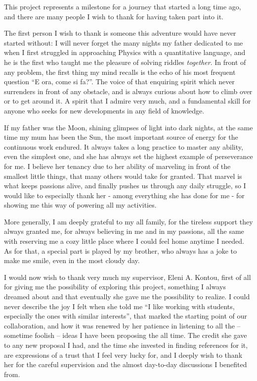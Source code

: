 This project represents a milestone for a journey that started a long time ago, and there are many people I wish to thank for having taken part into it.

The first person I wish to thank is someone this adventure would have never started without: I will never forget the many nights my father dedicated to me when I first struggled in approaching Physics with a quantitative language, and he is the first who taught me the pleasure of solving riddles \emph{together}. In front of any problem, the first thing my mind recalls is the echo of his most frequent question ``E ora, come si fa?''. The voice of that enquiring spirit which never surrenders in front of any obstacle, and is always curious about how to climb over or to get around it. A spirit that I admire very much, and a fundamental skill for anyone who seeks for new developments in any field of knowledge.

If my father was the Moon, shining glimpses of light into dark nights, at the same time my mum has been the Sun, the most important source of energy for the continuous work endured. It always takes a long practice to master any ability, even the simplest one, and she has always set the highest example of perseverance for me. I believe her tenancy due to her ability of marveling in front of the smallest little things, that many others would take for granted. That marvel is what keeps passions alive, and finally pushes us through any daily struggle, so I would like to especially thank her - among everything she has done for me - for showing me this way of powering all my activities.

More generally, I am deeply grateful to my all family, for the tireless support they always granted me, for always believing in me and in my passions, all the same with reserving me a cozy little place where I could feel home anytime I needed. As for that, a special part is played by my brother, who always has a joke to make me smile, even in the most cloudy day.

I would now wish to thank very much my supervisor, Eleni A. Kontou, first of all for giving me the possibility of exploring this project, something I always dreamed about and that eventually she gave me the possibility to realize. I could never describe the joy I felt when she told me ``I like working with students, especially the ones with similar interests'', that marked the starting point of our collaboration, and how it was renewed by her patience in listening to all the -- sometime foolish -- ideas I have been proposing the all time. The credit she gave to any new proposal I had, and the time she invested in finding references for it, are expressions of a trust that I feel very lucky for, and I deeply wish to thank her for the careful supervision and the almost day-to-day discussions I benefited from.

